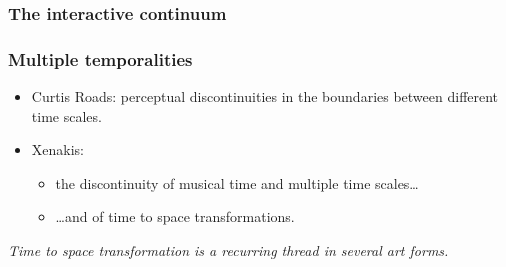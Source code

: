 \documentclass[]{beamer}
\begin{document}
\begin{frame}
  \frametitle{The interactive continuum}
  \vspace{1cm}
\end{frame}

\begin{frame}
  \frametitle{Multiple temporalities}
  \pause[2]
  \begin{block}{}
    \begin{itemize}
    \item<2-> Curtis Roads: perceptual discontinuities in the boundaries between different time scales.
    \item<3-> Xenakis:
      \begin{itemize}\item<4-> the discontinuity of musical time and multiple time scales\ldots
      \item<5-> \ldots and of time to space transformations.
      \end{itemize}
    \end{itemize}
  \end{block}
  \pause[6]
  \begin{block}{}
    \emph{Time to space transformation is a recurring thread in several art forms.}
  \end{block}
\end{frame}
\end{document}
